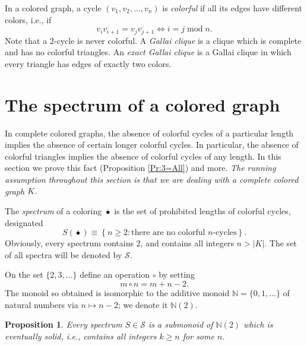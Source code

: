 \documentclass[12pt]{amsart}
\theoremstyle{plain}
\newtheorem{proposition}[theorem]{Proposition}
\numberwithin{equation}{section}
\begin{document}
In a colored graph, a cycle $\left(  v_{1},v_{2},\ldots,v_{n}\right)  $ is
\emph{colorful} if all its edges have different colors, i.e., if
\begin{displaymath}
    \overline{v_{i}v_{i+1}}=\overline{v_{j}v_{j+1}}\Longleftrightarrow
    i=j\operatorname{mod}n.
\end{displaymath}
Note that a $2$-cycle is never colorful. A \emph{Gallai clique} is a clique
which is complete and has no colorful triangles. An \emph{exact Gallai clique}
is a Gallai clique in which every triangle has edges of exactly two colors.

\section{The spectrum of a colored graph}\label{Sec:Spec}

In complete colored graphs, the absence of colorful cycles of a particular
length implies the absence of certain longer colorful cycles. In particular,
the absence of colorful triangles implies the absence of colorful cycles of any
length. In this section we prove this fact (Proposition \ref{Pr:3=All}) and
more. \emph{The running assumption throughout this section is that we are
dealing with a complete colored graph }$K\emph{.}$\emph{ }

The \emph{spectrum} of a coloring $\overline{\bullet}$ is the set of
prohibited lengths of colorful cycles, designated
\begin{displaymath}
    S\left(  \overline{\bullet}\right)  \equiv\left\{  n\geq2:\text{there are no
    colorful }n\text{-cycles}\right\}  .
\end{displaymath}
Obviously, every spectrum contains $2$, and contains all integers
$n>\left\vert K\right\vert $. The set of all spectra will be denoted by
$\mathcal{S}$.

On the set $\{2,3,\dots\}$ define an operation $\circ$ by setting
\begin{displaymath}
    m\circ n=m+n-2.
\end{displaymath}
The monoid so obtained is isomorphic to the additive monoid
$\mathbb{N}=\{0,1,\dots\}$ of natural numbers via $n\mapsto n-2$; we denote it
$\mathbb{N}(2)$.

\begin{proposition}
Every spectrum $S\in\mathcal{S}$ is a submonoid of $\mathbb{N}(2)$ which is
\emph{eventually solid}, i.e., contains all integers $k\geq n$ for some $n$.
\end{proposition}
\end{document}
